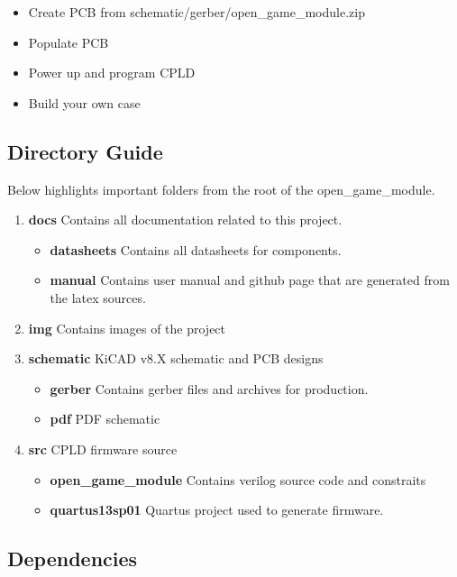 \begin{itemize}
  \item Create PCB from schematic/gerber/open\_game\_module.zip
  \item Populate PCB
  \item Power up and program CPLD
  \item Build your own case
\end{itemize}

\subsection{Directory Guide}

\par
Below highlights important folders from the root of the open\_game\_module.

\begin{enumerate}
  \item \textbf{docs} Contains all documentation related to this project.
    \begin{itemize}
      \item \textbf{datasheets} Contains all datasheets for components.
      \item \textbf{manual} Contains user manual and github page that are generated from the latex sources.
    \end{itemize}
  \item \textbf{img} Contains images of the project
  \item \textbf{schematic} KiCAD v8.X schematic and PCB designs
    \begin{itemize}
      \item \textbf{gerber} Contains gerber files and archives for production.
      \item \textbf{pdf} PDF schematic
    \end{itemize}
  \item \textbf{src} CPLD firmware source
    \begin{itemize}
      \item \textbf{open\_game\_module} Contains verilog source code and constraits
      \item \textbf{quartus13sp01} Quartus project used to generate firmware.
    \end{itemize}
\end{enumerate}

\subsection{Dependencies}

